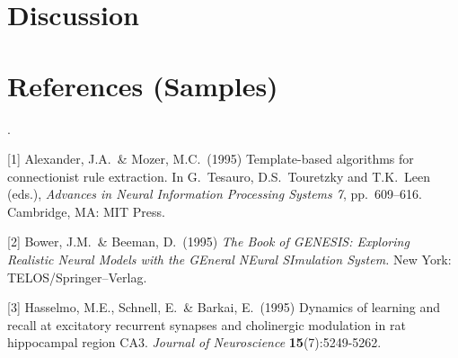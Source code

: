 \documentclass[12pt]{article}
\begin{document}
\section{Discussion}



\section*{References (Samples)}
\qquad \qquad \qquad \qquad \qquad \qquad \qquad \qquad \qquad \qquad \qquad \qquad \qquad \qquad \qquad \qquad \qquad \qquad \qquad \qquad \qquad \qquad \qquad \qquad \qquad \qquad .
 
\small
[1] Alexander, J.A.\ \& Mozer, M.C.\ (1995) Template-based algorithms for
connectionist rule extraction. In G.\ Tesauro, D.S.\ Touretzky and T.K.\ Leen
(eds.), {\it Advances in Neural Information Processing Systems 7},
pp.\ 609--616. Cambridge, MA: MIT Press.

[2] Bower, J.M.\ \& Beeman, D.\ (1995) {\it The Book of GENESIS: Exploring
  Realistic Neural Models with the GEneral NEural SImulation System.}  New York:
TELOS/Springer--Verlag.

[3] Hasselmo, M.E., Schnell, E.\ \& Barkai, E.\ (1995) Dynamics of learning and
recall at excitatory recurrent synapses and cholinergic modulation in rat
hippocampal region CA3. {\it Journal of Neuroscience} {\bf 15}(7):5249-5262.
\end{document}
